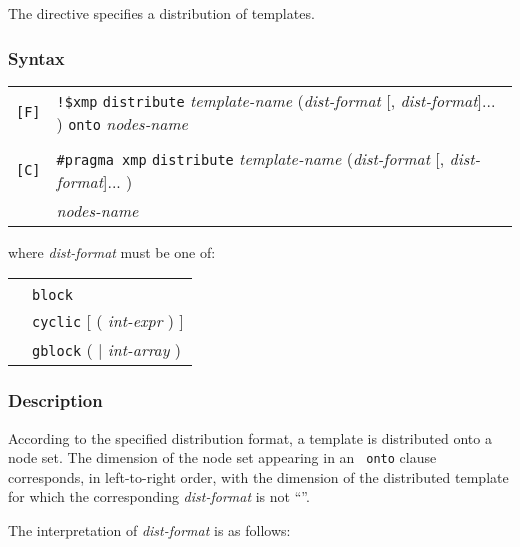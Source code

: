 The {\tt {}} directive specifies a distribution of
templates.

\subsubsection*{Syntax}

\begin{tabular}{ll}
\verb![F]! & \verb|!$xmp| {\tt distribute} {\it template-name} 
({\it dist-format} [, {\it dist-format}]... ) {\tt onto} {\it nodes-name} \\
& \\
\verb![C]! & \verb|#pragma xmp| {\tt distribute} {\it template-name} 
({\it dist-format} [, {\it dist-format}]... ) \\
& \hspace{3cm}{\tt onto} {\it nodes-name} \\
\end{tabular}
\vspace{0.3cm}

where {\it dist-format} must be one of:

\begin{tabular}{ll}
 \hspace{0.5cm} & {\tt *} \\
 & {\tt block} \\
 & {\tt cyclic} [ ( {\it int-expr} ) ] \\
 & {\tt gblock} ( {\tt *} $\vert$ {\it int-array} ) \\
\end{tabular}

\subsubsection*{Description}

According to the specified distribution format, a template is distributed
onto a node set. The dimension of the node set appearing in an {\tt
onto} clause corresponds, in left-to-right order, with the dimension of
the distributed template for which the corresponding {\it dist-format} is
not ``{\tt *}''. 

The interpretation of {\it dist-format} is as follows:

